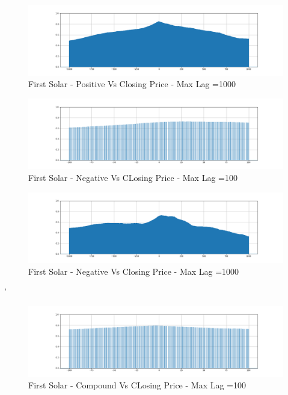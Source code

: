 \documentclass[sigconf, nonacm]{acmart}
\begin{document}
\begin{figure}[H]
  \centering
  \includegraphics[width=\linewidth]{images/fslr_1000_pos.png}
  \caption{First Solar - Positive Vs Closing Price - Max Lag =1000}
  \label{fslr_1000_pos}
\end{figure}




\begin{figure}[H]
  \centering
  \includegraphics[width=\linewidth]{images/fslr_100_neg.png}
  \caption{First Solar - Negative Vs CLosing Price - Max Lag =100}
  \label{fslr_100_neg}
\end{figure}

\begin{figure}[H]
  \centering
  \includegraphics[width=\linewidth]{images/fslr_1000_neg.png}
  \caption{First Solar - Negative Vs Closing Price - Max Lag =1000}
  \label{fslr_1000_neg}
\end{figure}

'%
\begin{figure}[H]
  \centering
  \includegraphics[width=\linewidth]{images/fslr_100_comp.png}
  \caption{First Solar - Compound Vs CLosing Price - Max Lag =100}
  \label{fslr_100_comp}
\end{figure}
\end{document}
